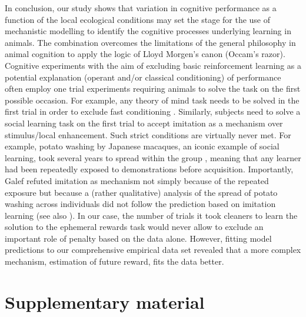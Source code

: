 \documentclass[]{rsos}%
\newcommand{\beginsupplement}{ \setcounter{table}{0}     \renewcommand{\thetable}{S\arabic{table}}\setcounter{figure}{0} \renewcommand{\thefigure}{S\arabic{figure}}}
\begin{document}
In conclusion, our study shows that variation in cognitive performance as
a function of the local ecological conditions may set the stage for the use of
mechanistic modelling to identify the cognitive processes underlying
learning in animals. The combination overcomes the limitations
of the general philosophy in animal cognition to apply the logic of
Lloyd Morgen's canon (Occam's razor). Cognitive experiments with the
aim of excluding basic reinforcement learning as a potential
explanation (operant and/or classical conditioning) of performance
often employ one trial experiments requiring animals to solve the
task on the first possible occasion.
For example, any theory of mind task needs to be solved in the first
trial in order to exclude fast conditioning \citep{heyes_Theory_1998}.
Similarly, subjects need to solve a social learning task on the first
trial to accept imitation as a mechanism over stimulus/local
enhancement. Such strict conditions are virtually never met. For
example, potato washing by Japanese macaques, an iconic example of
social learning, took several years to spread within the group
\citep{kawamura_Process_1959}, meaning that any learner had been repeatedly
exposed to demonstrations before acquisition. Importantly, Galef
\citep{galef_Question_1992} refuted imitation as mechanism not simply because
of the repeated exposure but because a (rather qualitative) analysis of
the spread of potato washing across individuals did not follow the
prediction based on imitation learning (see also
\citep{hirata_SweetPotato_2001}). In our case, the number of trials it took
cleaners to learn the solution to the ephemeral rewards task
would never allow to exclude an important role of
penalty based on the data
alone. However, fitting model predictions to our comprehensive empirical
data set revealed that a more complex mechanism, estimation of future reward,
fits the data better.

\newpage

\hypertarget{supplementary-material}{%
\section{Supplementary material}\label{supplementary-material}}

\beginsupplement
\end{document}
